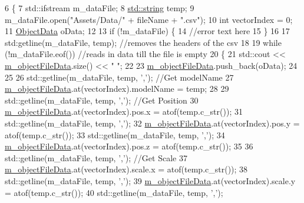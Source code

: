 \begin{DoxyCode}
6                                               \{
7     std::ifstream m\_dataFile;
8     \hyperlink{_types_8h_ad453f9f71ce1f9153fb748d6bb25e454}{std::string} temp;
9     m\_dataFile.open(\textcolor{stringliteral}{"Assets/Data/"} + fileName + \textcolor{stringliteral}{".csv"});
10     \textcolor{keywordtype}{int} vectorIndex = 0;
11     \hyperlink{struct_object_data}{ObjectData} oData;
12 
13     \textcolor{keywordflow}{if} (!m\_dataFile) \{
14         \textcolor{comment}{//error text here}
15     \}
16 
17     std:getline(m\_dataFile, temp);  \textcolor{comment}{//removes the headers of the csv}
18 
19     \textcolor{keywordflow}{while} (!m\_dataFile.eof())   \textcolor{comment}{//reads in data till the file is empty}
20     \{
21         std::cout << \hyperlink{class_object_loader_a3110eee250161ee33d7ac24f23489d11}{m\_objectFileData}.size() << \textcolor{stringliteral}{"    "};
22 
23         \hyperlink{class_object_loader_a3110eee250161ee33d7ac24f23489d11}{m\_objectFileData}.push\_back(oData);
24 
25 
26         std::getline(m\_dataFile, temp, \textcolor{charliteral}{','});    \textcolor{comment}{//Get modelName}
27         \hyperlink{class_object_loader_a3110eee250161ee33d7ac24f23489d11}{m\_objectFileData}.at(vectorIndex).modelName = temp;
28 
29         std::getline(m\_dataFile, temp, \textcolor{charliteral}{','});                                        \textcolor{comment}{//Get Position}
30         \hyperlink{class_object_loader_a3110eee250161ee33d7ac24f23489d11}{m\_objectFileData}.at(vectorIndex).pos.x = atof(temp.c\_str());
31         std::getline(m\_dataFile, temp, \textcolor{charliteral}{','});
32         \hyperlink{class_object_loader_a3110eee250161ee33d7ac24f23489d11}{m\_objectFileData}.at(vectorIndex).pos.y = atof(temp.c\_str());
33         std::getline(m\_dataFile, temp, \textcolor{charliteral}{','});
34         \hyperlink{class_object_loader_a3110eee250161ee33d7ac24f23489d11}{m\_objectFileData}.at(vectorIndex).pos.z = atof(temp.c\_str());
35 
36         std::getline(m\_dataFile, temp, \textcolor{charliteral}{','});                                        \textcolor{comment}{//Get Scale}
37         \hyperlink{class_object_loader_a3110eee250161ee33d7ac24f23489d11}{m\_objectFileData}.at(vectorIndex).scale.x = atof(temp.c\_str());
38         std::getline(m\_dataFile, temp, \textcolor{charliteral}{','});
39         \hyperlink{class_object_loader_a3110eee250161ee33d7ac24f23489d11}{m\_objectFileData}.at(vectorIndex).scale.y = atof(temp.c\_str());
40         std::getline(m\_dataFile, temp, \textcolor{charliteral}{','});

\end{DoxyCode}
